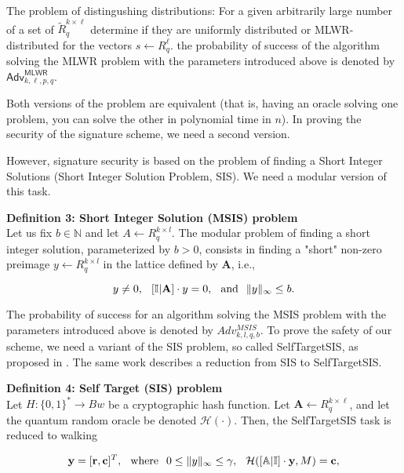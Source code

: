 \documentclass{article}
\theoremstyle{plain}
\theoremstyle{definition}
\begin{document}
    The problem of distingushing distributions: For a given arbitrarily large number of a set of $\tilde{R}^{k \times \ell}_q$ determine if they are uniformly distributed or MLWR-distributed for the vectors $s \leftarrow R^\ell_q$. the probability of success of the algorithm solving the MLWR problem with the parameters introduced above is denoted by $\mathsf{Adv}^{\mathsf{MLWR}}_{k, \ell, p, q}$.
    
    Both versions of the problem are equivalent (that is, having an oracle solving one problem, you can solve the other in polynomial time in $n$)\cite{BGM+16}. In proving the security of the signature scheme, we need a second version. 
    
    However, signature security is based on the problem of finding a Short Integer Solutions (Short Integer Solution Problem, SIS)\cite{Ajt96}. We need a modular version of this task.
    \newline

    \textbf{Definition 3: Short Integer Solution (MSIS) problem}\\ Let us fix $b \in \mathbb{N}$ and let $A \leftarrow R^{k \times l}_q$. The modular problem of finding a short integer solution, parameterized by $b > 0$, consists in finding a "short" non-zero preimage $y \leftarrow R^{k \times l}_q$ in the lattice defined by $\mathbf{A}$, i.e.,
    
    $$ y \neq 0,\hspace{.25cm} [\mathbb{I} | \mathbf{A}]\cdot y = 0, \hspace{.25cm}\text{and}\hspace{.25cm} \|y\|_\infty \leq b.$$

    The probability of success for an algorithm solving the MSIS problem with the parameters introduced above is denoted by $Adv^{MSIS}_{k, l, q, b}$. To prove the safety of our scheme, we need a variant of the SIS problem, so called SelfTargetSIS, as proposed in \cite{KLS18}. The same work describes a reduction from SIS to SelfTargetSIS.
    \newline

    \textbf{Definition 4: Self Target (SIS) problem}\\
    Let $H: \{0, 1\}^* \rightarrow Bw$ be a cryptographic hash function. Let $\mathbf{A} \leftarrow R^{k \times \ell}_q$, and let the quantum random oracle be denoted $\mathcal{H}(\cdot)$. Then, the SelfTargetSIS task is reduced to walking

    $$
    \mathbf{y} = [\mathbf{r}, \mathbf{c}]^{T}, \hspace{.25cm}\text{where}\hspace{.25cm} 0 \leq \|y\|_{\infty} \leq \gamma,\hspace{.25cm} \mathcal{H}([\mathbb{A} | \mathbb{I}] \cdot \mathbf{y}, M) = \mathbf{c},
    $$
\end{document}
